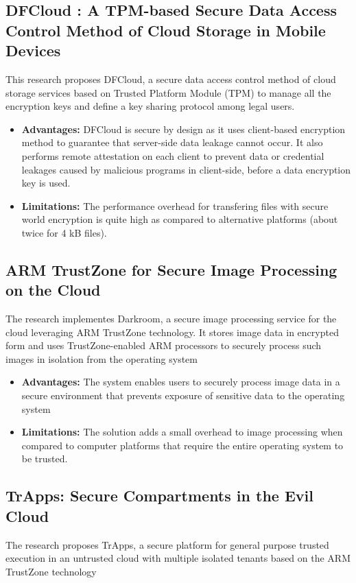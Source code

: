 \documentclass[conference]{IEEEtran}
\begin{document}
\subsection{DFCloud : A TPM-based Secure Data Access Control Method of Cloud Storage in Mobile Devices }
\cite{cloud7} This research proposes DFCloud, a secure data access control method of cloud storage services based on Trusted Platform Module (TPM) to manage all the encryption keys and define a key sharing protocol among legal users.

\begin{itemize}
    \item \textbf{Advantages:} DFCloud is secure by design as it uses client-based encryption method to guarantee that server-side data leakage cannot occur. It also performs remote attestation on each client to prevent data or credential leakages caused by malicious programs in client-side, before a data encryption key is used.
    \item \textbf{Limitations:} The performance overhead for transfering files with secure world encryption is quite high as compared to alternative platforms (about twice for 4 kB files).
\end{itemize}


\subsection{ARM TrustZone for Secure Image Processing on the Cloud }
\cite{cloud8} The research implementes Darkroom, a secure image processing service for the cloud leveraging ARM TrustZone technology. It stores image data in encrypted form and uses TrustZone-enabled ARM processors to securely process such images in isolation from the operating system

\begin{itemize}
    \item \textbf{Advantages:} The system enables users to securely process image data in a secure environment that prevents exposure of sensitive data to the operating system
    \item \textbf{Limitations:} The solution adds a small overhead to image processing when compared to computer platforms that require the entire operating system to be trusted.
\end{itemize}


\subsection{TrApps: Secure Compartments in the Evil Cloud }
\cite{cloud9} The research proposes TrApps, a secure platform for general purpose trusted execution in an untrusted cloud with multiple isolated tenants based on the ARM TrustZone technology
\end{document}
